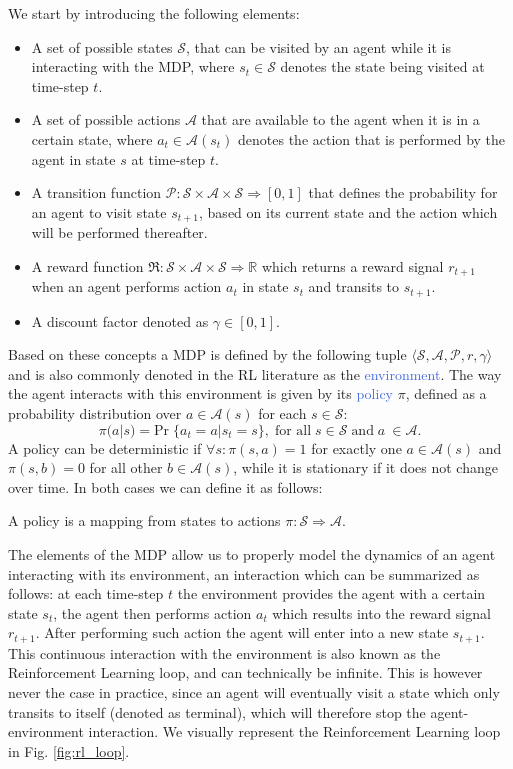 We start by introducing the following elements:
\begin{itemize}
	\item A set of possible states $\mathcal{S}$, that can be visited by an agent while it is interacting with the MDP, where $s_t \in \mathcal{S}$ denotes the state being visited at time-step $t$.
	\item A set of possible actions $\mathcal{A}$ that are available to the agent when it is in a certain state, where $a_t \in \mathcal{A}(s_t)$ denotes the action that is performed by the agent in state $s$ at time-step $t$.
\item A transition function $\mathcal{P}:\mathcal{S}\times\mathcal{A}\times\mathcal{S}\Rightarrow [0,1]$ that defines the probability for an agent to visit state $s_{t+1}$, based on its current state and the action which will be performed thereafter.
\item A reward function $\Re:\mathcal{S}\times\mathcal{A}\times\mathcal{S}\Rightarrow \mathbb{R}$ which returns a reward signal $r_{t+1}$ when an agent performs action $a_t$ in state $s_t$ and transits to $s_{t+1}$.
\item A discount factor denoted as $\gamma \in [0,1]$.

\end{itemize}

Based on these concepts a MDP is defined by the following tuple $\langle\mathcal{S}, \mathcal{A}, \mathcal{P}, r, \gamma\rangle$ and is also commonly denoted in the RL literature as the \textcolor{RoyalBlue}{environment}. The way the agent interacts with this environment is given by its \textcolor{RoyalBlue}{policy} $\pi$, defined as a probability distribution over $a \in \mathcal{A}(s)$ for each $s \in \mathcal{S}$:
\begin{equation}
	\pi(a|s) = \text{Pr}\; \{a_t = a | s_t = s\}, \; \text{for all}\; s \in \mathcal{S}\; \text{and}\; a\ \in \mathcal{A}. 
\end{equation}
A policy can be deterministic if $\forall s:\pi(s,a) = 1$ for exactly one $a \in \mathcal{A}(s)$ and $\pi(s,b)=0$ for all other $b \in \mathcal{A}(s)$, while it is stationary if it does not change over time. In both cases 
we can define it as follows:
\begin{definition}
	A policy is a mapping from states to actions $\pi:\mathcal{S}\Rightarrow\mathcal{A}$. 
\end{definition}
The elements of the MDP allow us to properly model the dynamics of an agent interacting with its environment, an interaction which can be summarized as follows: at each time-step $t$ the environment provides the agent with a certain state $s_t$, the agent then performs action $a_t$ which results into the reward signal $r_{t+1}$. After performing such action the agent will enter into a new state $s_{t+1}$. This continuous interaction with the environment is also known as the Reinforcement Learning loop, and can technically be infinite. This is however never the case in practice, since an agent will eventually visit a state which only transits to itself (denoted as terminal), which will therefore stop the agent-environment interaction. We visually represent the Reinforcement Learning loop in Fig. \ref{fig:rl_loop}.

